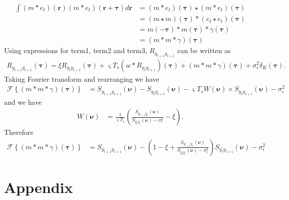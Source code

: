\documentclass[]{article}
\begin{document}
\begin{align}
 \int\left(m \ast e_t\right)(\mathbf r)\left(m \ast e_t\right)(\mathbf r+\boldsymbol\tau)d\mathbf r&=\left(m \ast e_t\right)(\boldsymbol\tau)\star\left(m \ast e_t\right)(\boldsymbol\tau) \nonumber \\
&=\left(m \star m\right)(\boldsymbol\tau)\ast\left(e_t \star e_t\right)(\boldsymbol\tau) \nonumber\\
&=m(-\boldsymbol\tau)\ast m(\boldsymbol\tau)\ast \gamma(\boldsymbol\tau) \nonumber \\
&=(m\ast m \ast \gamma)(\boldsymbol\tau)
\end{align}
Using expressions for term1, term2 and term3, $R_{y_{t+1}y_{t+1}}$ can be written as
\begin{align}
	R_{y_{t+1}y_{t+1}}(\boldsymbol{\tau})= \xi R_{y_ty_{t+1}}(\boldsymbol{\tau})+\varsigma T_s \left(w \ast R_{y_ty_{t+1}} \right)(\boldsymbol{\tau})+(m\ast m \ast \gamma)(\boldsymbol\tau)+\sigma_{\epsilon}^2\delta_K(\boldsymbol{\tau}).
\end{align}
Taking Fourier transform and rearranging we have
\begin{align}
 \mathcal F\left\lbrace (m\ast m \ast \gamma)(\boldsymbol\tau)\right\rbrace&= S_{y_{t+1}y_{t+1}}(\boldsymbol{\nu})-S_{y_{t}y_{t+1}}(\boldsymbol{\nu})-\varsigma T_s W(\boldsymbol{\nu}) \times S_{y_ty_{t+1}}(\boldsymbol{\nu})-\sigma_{\epsilon}^2 
\end{align}
and we have
\begin{align}
 W(\boldsymbol{\nu}) &=\frac{1}{\varsigma T_s}\left(\frac{S_{y_{t+1}y_t}(\boldsymbol{\nu})}{S_{y_ty_t}(\boldsymbol{\nu})-\sigma_{\epsilon}^2}-\xi\right).
\end{align}
Therefore
\begin{align}
 \mathcal F\left\lbrace (m\ast m \ast \gamma)(\boldsymbol\tau)\right\rbrace&= S_{y_{t+1}y_{t+1}}(\boldsymbol{\nu})-\left(1-\xi+\frac{S_{y_{t+1}y_t}(\boldsymbol{\nu})}{S_{y_ty_t}(\boldsymbol{\nu})-\sigma_{\epsilon}^2}\right)S_{y_{t}y_{t+1}}(\boldsymbol{\nu})-\sigma_{\epsilon}^2
\end{align}

\section*{Appendix}
\end{document}

